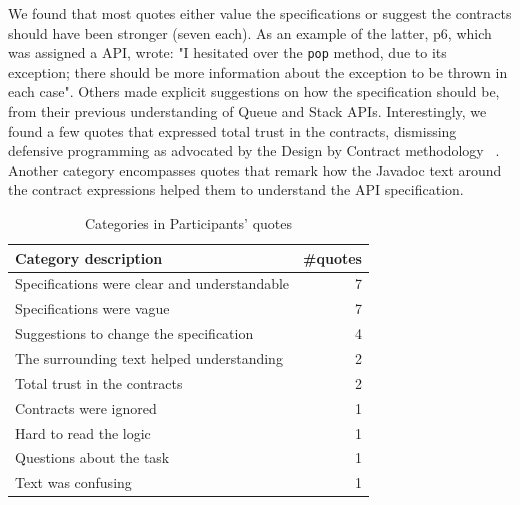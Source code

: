 We found that most quotes either value the specifications or suggest the contracts should have been stronger (seven each). As an example of the latter, p6, which was assigned a \contractjdoc{} API, wrote: "I hesitated over the \texttt{pop} method, due to its exception; there should be more information about the exception to be thrown in each case". 
Others made explicit suggestions on how the specification should be, from their previous understanding of Queue and Stack APIs.
Interestingly, we found a few quotes that expressed total trust in the contracts, dismissing defensive programming as advocated by the Design by Contract methodology ~\cite{dbc}.
Another category encompasses quotes that remark how the Javadoc text around the contract expressions helped them to understand the API specification. 

\begin{table}
\centering
\caption{Categories in Participants' quotes}
\label{tab:categories}
\begin{tabular}{|l|r|} 
\hline
\textbf{Category description}                & \multicolumn{1}{l|}{\textbf{\#quotes}}  \\ 
\hline\hline
Specifications were clear and understandable & 7                                       \\ 
\hline
Specifications were vague                    & 7                                       \\ 
\hline
Suggestions to change the specification      & 4                                       \\ 
\hline
The surrounding text helped understanding    & 2                                       \\ 
\hline
Total trust in the contracts                 & 2                                       \\ 
\hline
Contracts were ignored                       & 1                                       \\ 
\hline
Hard to read the logic                       & 1                                       \\ 
\hline
Questions about the task                     & 1                                       \\ 
\hline
Text was confusing                           & 1                                       \\
\hline
\end{tabular}
\end{table}



